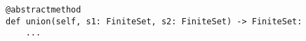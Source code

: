 \begin{verbatim}
@abstractmethod
def union(self, s1: FiniteSet, s2: FiniteSet) -> FiniteSet:
    ...
\end{verbatim}